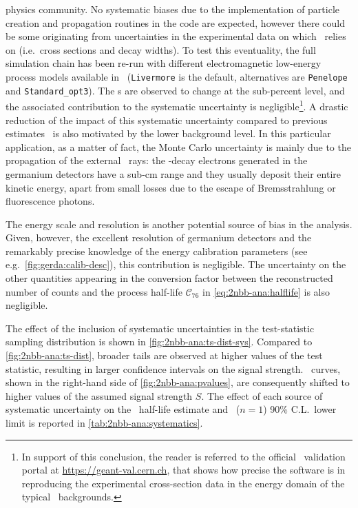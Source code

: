 \begin{description}[wide]
    physics community. No systematic biases due to the implementation of particle creation
    and propagation routines in the code are expected, however there could be some
    originating from uncertainties in the experimental data on which \geant\ relies on
    (i.e.~cross sections and decay widths). To test this eventuality, the full simulation
    chain has been re-run with different electromagnetic low-energy process models
    available in \geant\ (\texttt{Livermore} is the default, alternatives are
    \texttt{Penelope} and \texttt{Standard\_opt3}). The \pdf{}s are observed to change at the
    sub-percent level, and the associated contribution to the systematic uncertainty is
    negligible\footnote{%
      In support of this conclusion, the reader is referred to the official \geant\
      validation portal at \url{https://geant-val.cern.ch}, that shows how precise the
      software is in reproducing the experimental cross-section data in the energy domain
      of the typical \gerda\ backgrounds.
    }. A drastic reduction of the impact of this systematic uncertainty compared to
    previous estimates~\cite{Agostini2012a} is also motivated by the lower background
    level. In this particular application, as a matter of fact, the Monte Carlo
    uncertainty is mainly due to the propagation of the external \g\ rays: the \nnbb-decay
    electrons generated in the germanium detectors have a sub-cm range and they usually
    deposit their entire kinetic energy, apart from small losses due to the escape of
    Bremsstrahlung or fluorescence photons.

  \item[Other sources] The energy scale and resolution is another potential source of
    bias in the analysis. Given, however, the excellent resolution of germanium detectors
    and the remarkably precise knowledge of the energy calibration parameters (see
    e.g.~\cref{fig:gerda:calib-desc}), this contribution is negligible. The uncertainty on
    the other quantities appearing in the conversion factor between the reconstructed
    number of counts and the process half-life $\mathcal{C}_{76}$ in
    \cref{eq:2nbb-ana:halflife} is also negligible.

\end{description}

The effect of the inclusion of systematic uncertainties in the test-statistic sampling
distribution is shown in \cref{fig:2nbb-ana:ts-dist-sys}. Compared to
\cref{fig:2nbb-ana:ts-dist}, broader tails are observed at higher values of the test
statistic, resulting in larger confidence intervals on the signal strength. \pvalue\
curves, shown in the right-hand side of \cref{fig:2nbb-ana:pvalues}, are consequently
shifted to higher values of the assumed signal strength $S$. The effect of each source of
systematic uncertainty on the \nnbb\ half-life estimate and \onbbx\ ($n=1$) 90\%
C.L.~lower limit is reported in \cref{tab:2nbb-ana:systematics}.

